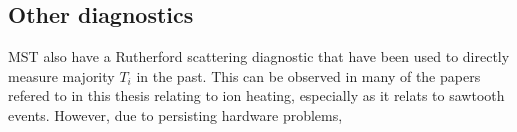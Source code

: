 \subsection{Other diagnostics}

MST also have a Rutherford scattering diagnostic that have been used to directly measure majority $T_i$ in the past. This can be observed in many of the papers refered to in this thesis relating to ion heating, especially as it relats to sawtooth events. However, due to persisting hardware problems, 